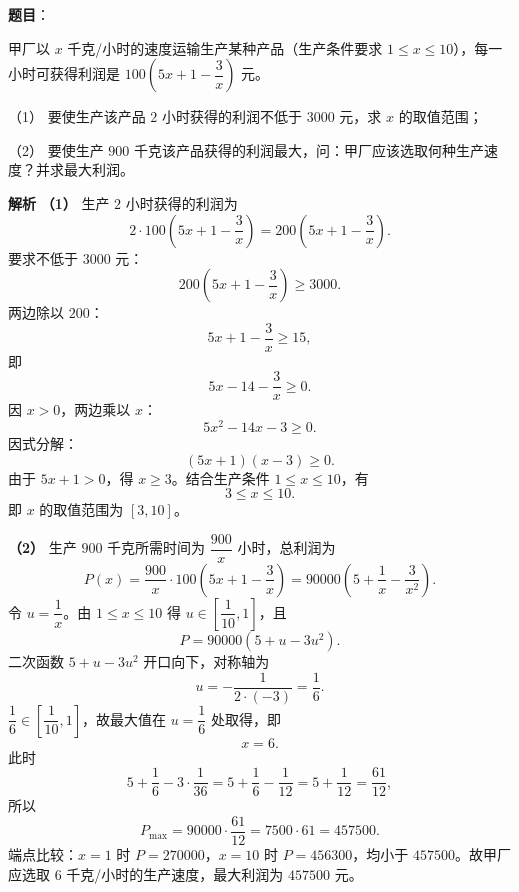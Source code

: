 \begin{answer}

\textbf{题目}：

甲厂以 $x$ 千克/小时的速度运输生产某种产品（生产条件要求 $1\leqslant x\leqslant10$），每一小时可获得利润是 $100\left(5x+1-\dfrac3x\right)$ 元。

（1） 要使生产该产品 $2$ 小时获得的利润不低于 $3000$ 元，求 $x$ 的取值范围；

（2） 要使生产 $900$ 千克该产品获得的利润最大，问：甲厂应该选取何种生产速度？并求最大利润。

\textbf{解析}
\textbf{（1）} 生产 $2$ 小时获得的利润为
\nopagebreak[4]
\[2\cdot100\left(5x+1-\frac3x\right)=200\left(5x+1-\frac3x\right).\]
要求不低于 $3000$ 元：
\nopagebreak[4]
\[200\left(5x+1-\frac3x\right)\geqslant3000.\]
两边除以 $200$：
\nopagebreak[4]
\[5x+1-\frac3x\geqslant15,\]
即
\nopagebreak[4]
\[5x-14-\frac3x\geqslant0.\]
因 $x>0$，两边乘以 $x$：
\nopagebreak[4]
\[5x^2-14x-3\geqslant0.\]
因式分解：
\nopagebreak[4]
\[(5x+1)(x-3)\geqslant0.\]
由于 $5x+1>0$，得 $x\geqslant3$。结合生产条件 $1\leqslant x\leqslant10$，有
\nopagebreak[4]
\[3\leqslant x\leqslant10.\]
即 $x$ 的取值范围为 $[3,10]$。

\textbf{（2）} 生产 $900$ 千克所需时间为 $\dfrac{900}{x}$ 小时，总利润为
\nopagebreak[4]
\[P(x)=\frac{900}{x}\cdot100\left(5x+1-\frac3x\right)
=90000\left(5+\frac1x-\frac{3}{x^2}\right).\]
令 $u=\dfrac1x$。由 $1\leqslant x\leqslant10$ 得 $u\in\left[\dfrac1{10},1\right]$，且
\nopagebreak[4]
\[P=90000\left(5+u-3u^2\right).\]
二次函数 $5+u-3u^2$ 开口向下，对称轴为
\nopagebreak[4]
\[u=-\frac{1}{2\cdot(-3)}=\frac16.\]
$\dfrac16\in\left[\dfrac1{10},1\right]$，故最大值在 $u=\dfrac16$ 处取得，即
\nopagebreak[4]
\[x=6.\]
此时
\nopagebreak[4]
\[5+\frac16-3\cdot\frac1{36}
=5+\frac16-\frac1{12}
=5+\frac1{12}=\frac{61}{12},\]
所以
\nopagebreak[4]
\[P_{\max}=90000\cdot\frac{61}{12}=7500\cdot61=457500.\]
端点比较：$x=1$ 时 $P=270000$，$x=10$ 时 $P=456300$，均小于 $457500$。故甲厂应选取 $6$ 千克/小时的生产速度，最大利润为 $457500$ 元。



\end{answer}
